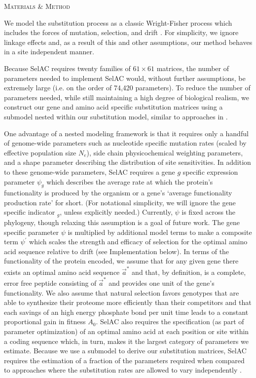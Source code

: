\documentclass[12pt,letterpaper]{article}
\renewcommand{\section}[1]{%
\bigskip
\begin{center}
\begin{Large}
\normalfont\scshape #1
\medskip
\end{Large}
\end{center}}
\newcommand{\Ne}{\ensuremath{{N_e}}\xspace} %
\newcommand{\selac}{SelAC\xspace}
\newcommand{\aoptvec}{\ensuremath{\Vec{a}^*}\xspace}
\newcommand{\psig}{\ensuremath{\psi_{g}}\xspace}
\newcommand{\psiprime}{\ensuremath{\psi^\prime}\xspace}
\begin{document}
\section{Materials \& Method}
We model the substitution process as a classic Wright-Fisher process which includes the forces of mutation, selection, and drift \citep{Fisher1930,Kimura1962,Wright1969,Iwasa1988,BergAndLassig2003,SellaAndHirsh2005,McCandlishAndStoltzfus2014}.
For simplicity, we ignore linkage effects and, as a result of this and other assumptions, our method behaves in a site independent manner.

Because \selac requires twenty families of $61 \times 61$ matrices, the number of parameters needed to implement \selac would, without further assumptions, be extremely large (i.e. on the order of 74,420 parameters).
To reduce the number of parameters needed, while still maintaining a high degree of biological realism, we construct our gene and amino acid specific substitution matrices using a submodel nested within our substitution model, similar to approaches in \citet{Gilchrist2007,ShahAndGilchrist2011,GilchristEtAl2015}.

One advantage of a nested modeling framework is that it requires only a handful of genome-wide parameters such as nucleotide specific mutation rates (scaled by effective population size \Ne), side chain physicochemical weighting parameters, and a shape parameter describing the distribution of site sensitivities.
In addition to these genome-wide parameters, \selac requires a gene $g$ specific expression parameter $\psig$ which describes the average rate at which the protein's functionality is produced by the organism or a gene's `average functionality production rate' for short.
(For notational simplicity, we will ignore the gene specific indicator $_g$, unless explicitly needed.)
Currently, $\psi$ is fixed across the phylogeny, though relaxing this assumption is a goal of future work.
The gene specific parameter $\psi$ is multiplied by additional model terms to make a composite term $\psiprime$ which scales the strength and efficacy of selection for the optimal amino acid sequence relative to drift (see Implementation below).
In terms of the functionality of the protein encoded, we assume that for any given gene there exists an optimal amino acid sequence \aoptvec and that, by definition, is a complete, error free peptide consisting of \aoptvec and provides one unit of the gene's functionality.
We also assume that natural selection favors genotypes that are able to synthesize their proteome more efficiently than their competitors and that each savings of an high energy phosphate bond per unit time leads to a constant proportional gain in fitness $A_0$.
\selac also requires the specification (as part of parameter optimization) of an optimal amino acid at each position or site within a coding sequence which, in turn, makes it the largest category of parameters we estimate.
Because we use a submodel to derive our substitution matrices, \selac requires the estimation of a fraction of the parameters required when compared to approaches where the substitution rates are allowed to vary independently \citep{HalpernAndBruno1998,LartillotAndPhilippe2004,RodrigueAndLartillot2014}.
\end{document}

